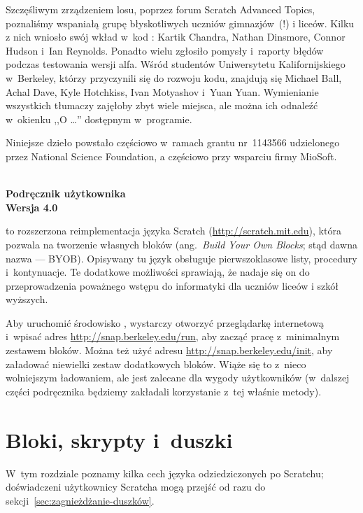 \documentclass[a4paper]{report}
\begin{document}
Szczęśliwym zrządzeniem losu, poprzez forum Scratch Advanced Topics, poznaliśmy wspaniałą grupę błyskotliwych uczniów gimnazjów~(!\@) i liceów. Kilku z nich wniosło swój wkład w~kod : Kartik Chandra, Nathan Dinsmore, Connor Hudson i~Ian Reynolds. Ponadto wielu zgłosiło pomysły i~raporty błędów podczas testowania wersji alfa. Wśród studentów Uniwersytetu Kalifornijskiego w~Berkeley, którzy przyczynili się do rozwoju kodu, znajdują się Michael Ball, Achal Dave, Kyle Hotchkiss, Ivan Motyashov i~Yuan Yuan. Wymienianie wszystkich tłumaczy zajęłoby zbyt wiele miejsca, ale można ich odnaleźć w~okienku ,,O \Snap{}\ldots'' dostępnym w~programie.

Niniejsze dzieło powstało częściowo w~ramach grantu nr~1143566 udzielonego przez National Science Foundation, a częściowo przy wsparciu firmy MioSoft.

\clearpage

\begin{center}
\bf \Huge \Snap{} \\
Podręcznik użytkownika \\
\huge Wersja 4.0 \vspace{40pt}
\end{center}

\Snap{} to rozszerzona reimplementacja języka Scratch (\url{http://scratch.mit.edu}), która pozwala na tworzenie własnych bloków (ang.\ \textit{Build Your Own Blocks}; stąd dawna nazwa  --- BYOB). Opisywany tu język obsługuje pierwszoklasowe listy, procedury i~kontynuacje. Te dodatkowe możliwości sprawiają, że nadaje się on do przeprowadzenia poważnego wstępu do informatyki dla uczniów liceów i szkół wyższych.

Aby uruchomić środowisko \Snap{}, wystarczy otworzyć przeglądarkę internetową i~wpisać adres \url{http://snap.berkeley.edu/run}, aby zacząć pracę z~minimalnym zestawem bloków. Można też użyć adresu \url{http://snap.berkeley.edu/init}, aby załadować niewielki zestaw dodatkowych bloków. Wiąże się to z~nieco wolniejszym ładowaniem, ale jest zalecane dla wygody użytkowników (w~dalszej części podręcznika będziemy zakładali korzystanie z~tej właśnie metody).

\clearpage

\chapter{Bloki, skrypty i~duszki}

W~tym rozdziale poznamy kilka cech języka \Snap{} odziedziczonych po Scratchu; doświadczeni użytkownicy Scratcha mogą przejść od razu do sekcji~\ref{sec:zagnieżdżanie-duszków}.
\end{document}
